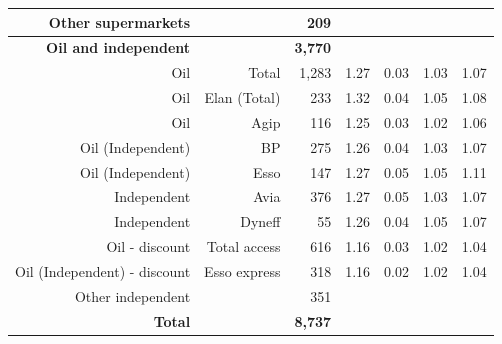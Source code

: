 \documentclass[english]{article}
\begin{document}
\begin{figure}[!h]
\begin{tabular}{rrrrrrr}
    Other supermarkets &       & 209   &       &       &       &  \\
		\hline
    \textbf{Oil and independent} &       & \textbf{3,770} &       &       &       &  \\
    Oil   & Total & 1,283 & 1.27  & 0.03  & 1.03  & 1.07 \\
    Oil   & Elan (Total) & 233   & 1.32  & 0.04  & 1.05  & 1.08 \\
    Oil   & Agip  & 116   & 1.25  & 0.03  & 1.02  & 1.06 \\
    Oil (Independent) & BP    & 275   & 1.26  & 0.04  & 1.03  & 1.07 \\
    Oil (Independent) & Esso  & 147   & 1.27  & 0.05  & 1.05  & 1.11 \\
    Independent & Avia  & 376   & 1.27  & 0.05  & 1.03  & 1.07 \\
    Independent & Dyneff & 55    & 1.26  & 0.04  & 1.05  & 1.07 \\
    Oil - discount & Total access & 616   & 1.16  & 0.03  & 1.02  & 1.04 \\
    Oil (Independent) - discount & Esso express & 318   & 1.16  & 0.02  & 1.02  & 1.04 \\
    Other independent &       & 351   &       &       &       &  \\
		\hline
    \textbf{Total} &       & \textbf{8,737} &       &       &       &  \\
    \hline
		\hline
    \end{tabular}%
  \label{tab:station_chains}%
\end{figure}

\newpage
\end{document}
